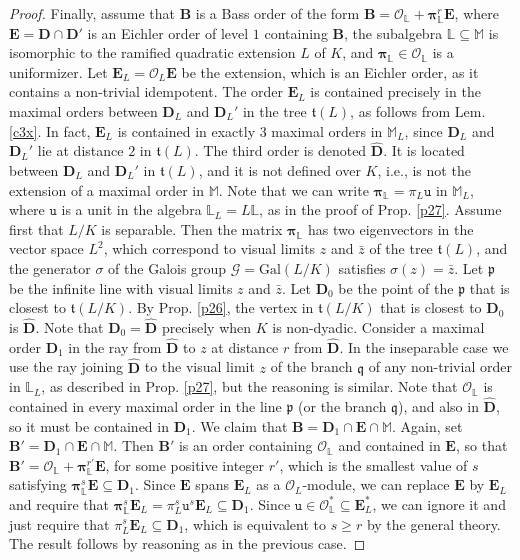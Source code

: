 \documentclass{amsart}
\theoremstyle{definition}
\newcommand\lu{\mathbb{L}}
\newcommand\alge{\mathbb{M}}
\newcommand\oink{\mathcal O}
\newcommand\Ba{\mathbf B}
\newcommand\Da{\mathbf{D}}
\newcommand\Ea{\mathbf{E}}
\begin{document}
\begin{proof}
Finally, assume that $\Ba$ is a Bass order of the form 
$\Ba=\mathcal{O}_{\lu}+
\boldsymbol\pi_{\lu}^r\Ea$,
where $\Ea=\Da\cap\Da'$ is an 
Eichler order of level $1$
containing $\Ba$, the subalgebra 
$\lu\subseteq\alge $ is isomorphic
to the ramified quadratic 
extension $L$ of $K$,  and 
$\boldsymbol\pi_{\lu}\in\oink_{\lu}$
is a uniformizer. Let 
$\Ea_L=\oink_L\Ea$ be the extension,
which is an Eichler order, as it 
contains a non-trivial
idempotent. The order $\Ea_L$ is
contained precisely 
in the maximal orders between 
$\Da_L$ and $\Da_L'$ 
in the tree $\mathfrak{t}(L)$, 
as follows from Lem.
\ref{c3x}. In fact, $\Ea_L$ is contained
in exactly $3$ maximal orders in $\alge_L$,
since $\Da_L$ and $\Da_L'$ lie at distance $2$ in 
$\mathfrak{t}(L)$. The third order is
denoted $\hat{\Da}$.
It is located between $\Da_L$ and $\Da_L'$ in 
$\mathfrak{t}(L)$, and it is not defined over
$K$, i.e., is not the extension of a maximal 
order in $\alge$.
Note that we can write
$\boldsymbol\pi_{\lu}=
\pi_L\mathtt{u}$ in $\alge_L$, where 
$\mathtt{u}$ is a unit in 
the algebra $\lu_L=L\lu$,
as in the proof of Prop. \ref{p27}.
Assume first that $L/K$ is separable. Then
the matrix $\boldsymbol\pi_{\lu}$ has two 
eigenvectors in the vector 
space $L^2$, which correspond to visual 
limits $z$ and $\bar{z}$ 
of the tree $\mathfrak{t}(L)$, and the 
generator $\sigma$
of the Galois group $\mathcal{G}=
\mathrm{Gal}(L/K)$ 
satisfies $\sigma(z)=\bar{z}$. Let $\mathfrak{p}$
be the infinite line with visual limits 
$z$ and $\bar{z}$.
Let $\Da_0$ be the point of the  $\mathfrak{p}$
that is closest to $\mathfrak{t}(L/K)$.
By Prop. \ref{p26}, the vertex in 
$\mathfrak{t}(L/K)$ that is closest to $\Da_0$
is $\hat{\Da}$. Note that $\Da_0=\hat{\Da}$ 
precisely when $K$ is non-dyadic.
Consider a maximal order $\Da_1$ 
in the ray from $\hat{\Da}$ to $z$ at distance 
$r$ from $\hat{\Da}$. In the inseparable case
we use the ray joining $\hat{\Da}$ to 
the visual limit $z$ of the branch
$\mathfrak{q}$ of any non-trivial
order in $\lu_L$, as described in Prop.
\ref{p27}, but the reasoning is similar.
Note that $\oink_{\lu}$
is contained in every maximal order in the line $\mathfrak{p}$
(or the branch $\mathfrak{q}$),
and also in $\hat{\Da}$, so it must be contained in
$\Da_1$. We claim that
$\Ba=\Da_1\cap\Ea\cap\alge $. Again,
set $\Ba'=\Da_1\cap\Ea\cap\alge $.
Then $\Ba'$ is an order containing $\oink_{\lu}$
and contained in $\Ea$, so that 
$\Ba'=
\mathcal{O}_{\lu}+
\boldsymbol\pi_{\lu}^{r'}\Ea$,
for some positive integer $r'$, which is 
the smallest value of $s$ satisfying
$\boldsymbol\pi_{\lu}^s\Ea\subseteq\Da_1$.
Since $\Ea$ spans $\Ea_L$ as a $\oink_L$-module,
we can replace $\Ea$ by $\Ea_L$ and require that
$\boldsymbol\pi_{\lu}^s\Ea_L=
\pi_L^s\mathtt{u}^s\Ea_L\subseteq\Da_1$.
Since $\mathtt{u}\in\oink_{\lu}^*
\subseteq\Ea_L^*$, we can ignore it 
and just require
that $\pi_L^s\Ea_L\subseteq\Da_1$, which is 
equivalent to $s\geq r$ by the general theory. The result 
follows by reasoning as in the previous case.
\end{proof}
\end{document}
